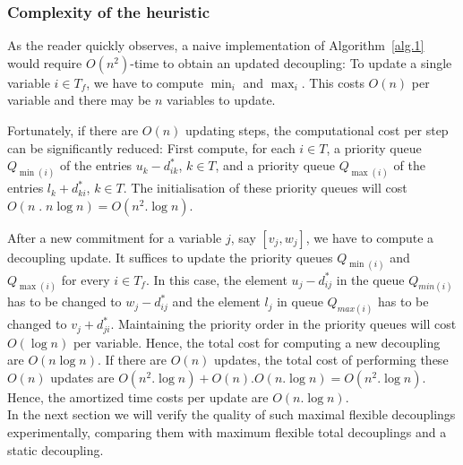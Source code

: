 \subsubsection{Complexity of the heuristic}
As the reader quickly observes, a naive implementation of Algorithm~\ref{alg.1} would require $O(n^2)$-time to obtain an updated decoupling: To update a single variable  $i \in T_f$, we have to compute  $\min_i$ and $\max_i$. This costs $O(n)$ per variable and there may be $n$ variables to update. 

Fortunately, if there are $O(n)$ updating steps, the computational cost per step can be significantly reduced: 
First compute, for each $i \in T$, a priority queue $Q_{\min(i)}$ of the entries $u_k - d^*_{ik}$, $k \in T$, and a priority queue $Q_{\max(i)}$ of the entries $l_k + d^*_{ki}$, $k \in T$.
The initialisation of these priority queues will cost $O( n\; .\; n \log n) = O(n^2 .\log n)$.

After a new commitment for a variable $j$, say $[v_j, w_j]$, we have to compute a decoupling update.
It suffices to update the priority queues $Q_{\min(i)}$ and $Q_{\max(i)}$ for every $i \in T_f$.
In this case, the element $u_j - d^*_{ij}$ in the queue $Q_{min(i)}$ has to be changed to $w_j - d^*_{ij}$ and  the element $l_j $ in queue $Q_{max(i)}$ has to be changed to $v_j + d^*_{ji}$. Maintaining the priority order in the priority queues will cost $O(\log n)$ per variable. Hence, the total cost for computing a new decoupling are $O(n \log n)$.
If there are $O(n)$ updates, the total cost of performing these $O(n)$ updates are $O(n^2 .\log n) + O(n) . O(n.\log n) = O(n^2. \log n)$. Hence, the amortized time costs per update are $O(n. \log n)$.\\

In the next section we will verify the quality of such maximal flexible decouplings experimentally, comparing them with maximum flexible total decouplings and a static decoupling.


 
%
%


